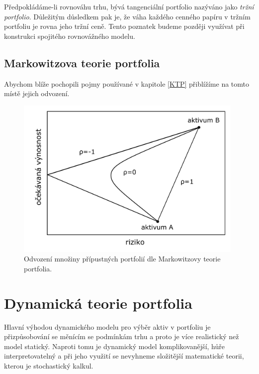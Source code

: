 \documentclass[a4paper,12pt]{report}
\theoremstyle{definition} \newtheorem{definice}[veta]{Definice}
\theoremstyle{remark}
\begin{document}
Předpokládáme-li rovnováhu trhu, bývá tangenciální portfolio nazýváno jako \textit{tržní portfolio}.
Důležitým důsledkem pak je, že váha každého cenného papíru v tržním portfoliu je rovna jeho tržní ceně. \label{vahy_trznihodnota}
Tento poznatek budeme později využívat při konstrukci spojitého rovnovážného modelu.

\subsection{Markowitzova teorie portfolia}\label{Markowitz_kap}

Abychom blíže pochopili pojmy používané v kapitole \ref{KTP} přiblížíme na tomto místě jejich odvození.

\begin{figure}[!htbp]
  \centering 
  \includegraphics[width=11cm]{IMG/pripustna_portfolia.pdf}
  \caption{Odvození množiny přípustných portfolií  dle Markowitzovy teorie portfolia.}
\end{figure}


\section{Dynamická teorie portfolia}
Hlavní výhodou dynamického modelu pro výběr aktiv v portfoliu je přizpůsobování se měnícím se podmínkám trhu a proto je více realistický než model statický.
Naproti tomu je dynamický model komplikovanější, hůře interpretovatelný a při jeho využití se nevyhneme složitější matematické teorii, kterou je stochastický kalkul.
\end{document}
